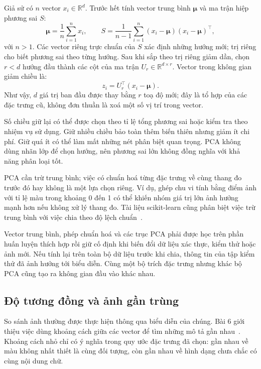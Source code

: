 Giả sử có $n$ vector $x_i\in\mathbb{R}^{d}$. Trước hết tính vector trung bình $\boldsymbol{\mu}$ và ma trận hiệp phương sai $S$:
\begin{equation}
 \boldsymbol{\mu}=\frac{1}{n}\sum_{i=1}^{n}x_i,\qquad
 S=\frac{1}{n-1}\sum_{i=1}^{n}(x_i-\boldsymbol{\mu})(x_i-\boldsymbol{\mu})^{\top},
 \label{eq:pca_covariance}
\end{equation}
với $n>1$. Các vector riêng trực chuẩn của $S$ xác định những hướng mới; trị riêng cho biết phương sai theo từng hướng. Sau khi sắp theo trị riêng giảm dần, chọn $r<d$ hướng đầu thành các cột của ma trận $U_r\in\mathbb{R}^{d\times r}$. Vector trong không gian giảm chiều là:
\begin{equation}
 z_i=U_r^{\top}(x_i-\boldsymbol{\mu}).
 \label{eq:pca_projection}
\end{equation}
Như vậy, $d$ giá trị ban đầu được thay bằng $r$ toạ độ mới; đây là tổ hợp của các đặc trưng cũ, không đơn thuần là xoá một số vị trí trong vector.

Số chiều giữ lại có thể được chọn theo tỉ lệ tổng phương sai hoặc kiểm tra theo nhiệm vụ sử dụng. Giữ nhiều chiều bảo toàn thêm biến thiên nhưng giảm ít chi phí. Giữ quá ít có thể làm mất những nét phân biệt quan trọng. PCA không dùng nhãn lớp để chọn hướng, nên phương sai lớn không đồng nghĩa với khả năng phân loại tốt.

PCA cần trừ trung bình; việc có chuẩn hoá từng đặc trưng về cùng thang đo trước đó hay không là một lựa chọn riêng. Ví dụ, ghép chu vi tính bằng điểm ảnh với tỉ lệ màu trong khoảng 0 đến 1 có thể khiến nhóm giá trị lớn ảnh hưởng mạnh hơn nếu không xử lý thang đo. Tài liệu scikit-learn cũng phân biệt việc trừ trung bình với việc chia theo độ lệch chuẩn~\cite{sklearn_pca}.

Vector trung bình, phép chuẩn hoá và các trục PCA phải được học trên phần huấn luyện thích hợp rồi giữ cố định khi biến đổi dữ liệu xác thực, kiểm thử hoặc ảnh mới. Nếu tính lại trên toàn bộ dữ liệu trước khi chia, thông tin của tập kiểm thử đã ảnh hưởng tới biểu diễn. Cùng một bộ trích đặc trưng nhưng khác bộ PCA cũng tạo ra không gian đầu vào khác nhau.

\subsection{Độ tương đồng và ảnh gần trùng}
So sánh ảnh thường được thực hiện thông qua biểu diễn của chúng. Bài 6 giới thiệu việc dùng khoảng cách giữa các vector để tìm những mô tả gần nhau~\cite{tailieu_bai6}. Khoảng cách nhỏ chỉ có ý nghĩa trong quy ước đặc trưng đã chọn: gần nhau về màu không nhất thiết là cùng đối tượng, còn gần nhau về hình dạng chưa chắc có cùng nội dung chữ.

